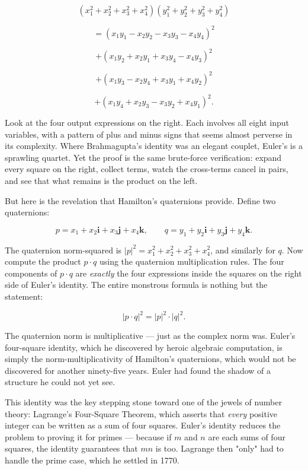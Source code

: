 \documentclass[11pt,twoside,openright]{book}
\theoremstyle{definition}
\theoremstyle{remark}
\begin{document}
\[(x_1^2 + x_2^2 + x_3^2 + x_4^2)(y_1^2 + y_2^2 + y_3^2 + y_4^2)\]

\[= (x_1 y_1 - x_2 y_2 - x_3 y_3 - x_4 y_4)^2\]

\[+ (x_1 y_2 + x_2 y_1 + x_3 y_4 - x_4 y_3)^2\]

\[+ (x_1 y_3 - x_2 y_4 + x_3 y_1 + x_4 y_2)^2\]

\[+ (x_1 y_4 + x_2 y_3 - x_3 y_2 + x_4 y_1)^2.\]

Look at the four output expressions on the right. Each involves all eight input variables, with a pattern of plus and minus signs that seems almost perverse in its complexity. Where Brahmagupta's identity was an elegant couplet, Euler's is a sprawling quartet. Yet the proof is the same brute-force verification: expand every square on the right, collect terms, watch the cross-terms cancel in pairs, and see that what remains is the product on the left.


But here is the revelation that Hamilton's quaternions provide. Define two quaternions:

\[p = x_1 + x_2\mathbf{i} + x_3\mathbf{j} + x_4\mathbf{k}, \qquad q = y_1 + y_2\mathbf{i} + y_3\mathbf{j} + y_4\mathbf{k}.\]

The quaternion norm-squared is $|p|^2 = x_1^2 + x_2^2 + x_3^2 + x_4^2$, and similarly for $q$. Now compute the product $p \cdot q$ using the quaternion multiplication rules. The four components of $p \cdot q$ are \textit{exactly} the four expressions inside the squares on the right side of Euler's identity. The entire monstrous formula is nothing but the statement:

\[|p \cdot q|^2 = |p|^2 \cdot |q|^2.\]

The quaternion norm is multiplicative --- just as the complex norm was. Euler's four-square identity, which he discovered by heroic algebraic computation, is simply the norm-multiplicativity of Hamilton's quaternions, which would not be discovered for another ninety-five years. Euler had found the shadow of a structure he could not yet see.


This identity was the key stepping stone toward one of the jewels of number theory: Lagrange's Four-Square Theorem, which asserts that \textit{every} positive integer can be written as a sum of four squares. Euler's identity reduces the problem to proving it for primes --- because if $m$ and $n$ are each sums of four squares, the identity guarantees that $mn$ is too. Lagrange then "only" had to handle the prime case, which he settled in 1770.
\end{document}

